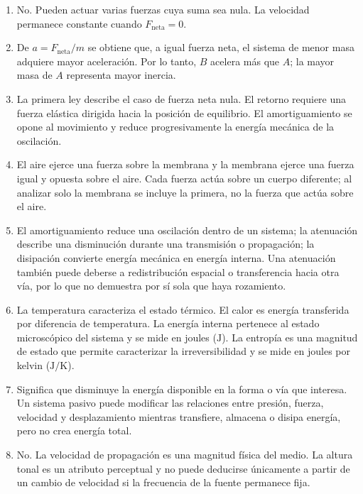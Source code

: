 \begin{enumerate}[label=\textbf{C\arabic*.},leftmargin=*]
    \item No. Pueden actuar varias fuerzas cuya suma sea nula. La velocidad
    permanece constante cuando \(F_\mathrm{neta}=0\).

    \item De \(a=F_\mathrm{neta}/m\) se obtiene que, a igual fuerza neta, el
    sistema de menor masa adquiere mayor aceleración. Por lo tanto, \(B\)
    acelera más que \(A\); la mayor masa de \(A\) representa mayor inercia.

    \item La primera ley describe el caso de fuerza neta nula. El retorno
    requiere una fuerza elástica dirigida hacia la posición de equilibrio. El
    amortiguamiento se opone al movimiento y reduce progresivamente la energía
    mecánica de la oscilación.

    \item El aire ejerce una fuerza sobre la membrana y la membrana ejerce una
    fuerza igual y opuesta sobre el aire. Cada fuerza actúa sobre un cuerpo
    diferente; al analizar solo la membrana se incluye la primera, no la fuerza
    que actúa sobre el aire.

    \item El amortiguamiento reduce una oscilación dentro de un sistema; la
    atenuación describe una disminución durante una transmisión o propagación;
    la disipación convierte energía mecánica en energía interna. Una atenuación
    también puede deberse a redistribución espacial o transferencia hacia otra
    vía, por lo que no demuestra por sí sola que haya rozamiento.

    \item La temperatura caracteriza el estado térmico. El calor es energía
    transferida por diferencia de temperatura. La energía interna pertenece al
    estado microscópico del sistema y se mide en joules
    (\(\text{J}\)). La entropía es una magnitud de estado que permite
    caracterizar la irreversibilidad y se mide en joules por kelvin
    (\(\text{J}/\text{K}\)).

    \item Significa que disminuye la energía disponible en la forma o vía que
    interesa. Un sistema pasivo puede modificar las relaciones entre presión,
    fuerza, velocidad y desplazamiento mientras transfiere, almacena o disipa
    energía, pero no crea energía total.

    \item No. La velocidad de propagación es una magnitud física del medio. La
    altura tonal es un atributo perceptual y no puede deducirse únicamente a
    partir de un cambio de velocidad si la frecuencia de la fuente permanece
    fija.
\end{enumerate}

